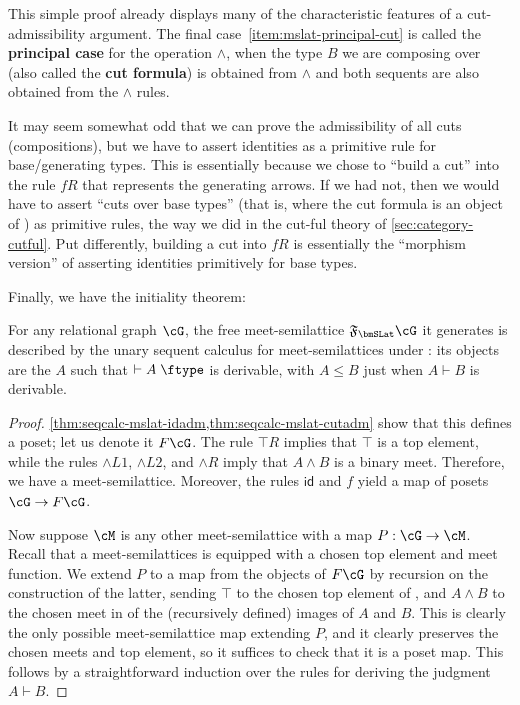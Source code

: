 \documentclass{book}
\def\idfunc{\mathsf{id}}
\let\types\vdash
\def\type{\;\ftype}
\newcommand{\F}[1]{\mathfrak{F}_{#1}}
\let\meet\wedge
\def\meetL{\mathord{\meet}L}
\def\meetR{\mathord{\meet}R}
\begin{document}
This simple proof already displays many of the characteristic features of a cut-admissibility argument.
The final case~\ref{item:mslat-principal-cut} is called the \textbf{principal case} for the operation $\meet$, when the type $B$ we are composing over (also called the \textbf{cut formula}) is obtained from $\meet$ and both sequents are also obtained from the $\meet$ rules.

\begin{rmk}
  It may seem somewhat odd that we can prove the admissibility of all cuts (compositions), but we have to assert identities as a primitive rule for base/generating types.
  This is essentially because we chose to ``build a cut'' into the rule $fR$ that represents the generating arrows.
  If we had not, then we would have to assert ``cuts over base types'' (that is, where the cut formula is an object of \cG) as primitive rules, the way we did in the cut-ful theory of \cref{sec:category-cutful}.
  Put differently, building a cut into $fR$ is essentially the ``morphism version'' of asserting identities primitively for base types.
\end{rmk}

Finally, we have the initiality theorem:

\begin{thm}\label{thm:seqcalc-mslat-initial}
  For any relational graph $\cG$, the free meet-semilattice $\F\bmSLat \cG$ it generates is described by the unary sequent calculus for meet-semilattices under \cG: its objects are the $A$ such that $\types A\type$ is derivable, with $A\le B$ just when $A\types B$ is derivable.
\end{thm}
\begin{proof}
  \cref{thm:seqcalc-mslat-idadm,thm:seqcalc-mslat-cutadm} show that this defines a poset; let us denote it $F\cG$.
  The rule $\top R$ implies that $\top$ is a top element, while the rules $\meetL1$, $\meetL2$, and $\meetR$ imply that $A\meet B$ is a binary meet.
  Therefore, we have a meet-semilattice.
  Moreover, the rules $\idfunc$ and $f$ yield a map of posets $\cG\to F\cG$.

  Now suppose $\cM$ is any other meet-semilattice with a map $P:\cG\to\cM$.
  Recall that a meet-semilattices is equipped with a chosen top element and meet function.
  We extend $P$ to a map from the objects of $F\cG$ by recursion on the construction of the latter, sending $\top$ to the chosen top element of \cM, and $A\meet B$ to the chosen meet in \cM of the (recursively defined) images of $A$ and $B$.
  This is clearly the only possible meet-semilattice map extending $P$, and it clearly preserves the chosen meets and top element, so it suffices to check that it is a poset map.
  This follows by a straightforward induction over the rules for deriving the judgment $A\types B$.
\end{proof}
\end{document}
